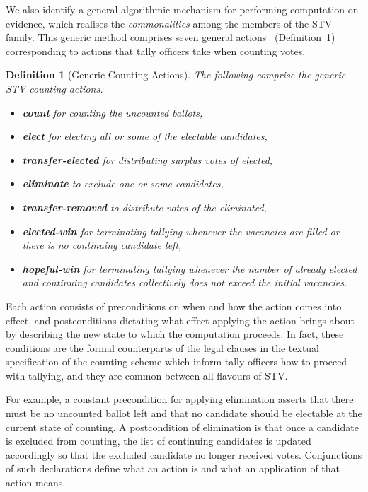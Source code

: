 \documentclass[10pt,conference]{IEEEtran}
\newtheorem{definition}{Definition}
\begin{document}
We also identify a general algorithmic mechanism for performing
computation on evidence, which realises the \emph{commonalities}
among the members of the STV family. This generic method comprises seven general actions%
~(Definition~\ref{transitions}) corresponding to actions that tally officers take when counting votes.
\begin{definition}[Generic Counting Actions]\label{transitions}
 The following comprise the generic STV counting actions.
 \begin{itemize}
\item\textbf{count} for counting the uncounted ballots,
\item\textbf{elect} for electing all or some of the electable candidates, 
\item\textbf{transfer-elected} for distributing surplus votes of elected, %
\item\textbf{eliminate} to exclude one or some candidates, 
\item\textbf{transfer-removed} to distribute votes of   the eliminated, %
\item\textbf{elected-win} for terminating tallying whenever the vacancies are filled or there is no continuing candidate left, 
\item\textbf{hopeful-win} for terminating tallying whenever  the number of already elected and continuing candidates collectively does not exceed the initial vacancies. 
\end{itemize}
\end{definition}
Each action consists of  preconditions on when and how the action
comes into effect, and postconditions dictating what effect applying
the action brings about by describing the new state to which the
computation proceeds. In fact, these conditions are the formal
counterparts of the legal clauses in the textual specification of
the counting scheme which inform tally officers how to proceed with tallying, and they are common between all flavours of STV. 

For example, a constant precondition for applying elimination
asserts that there must be no uncounted ballot left and that no
candidate should be electable at the current state of counting. A
postcondition of elimination is that once a candidate is excluded
from counting, the list of continuing candidates is updated
accordingly so that the excluded candidate no longer received votes.
Conjunctions of such declarations define what an action is and what an application of that action means.
\end{document}
